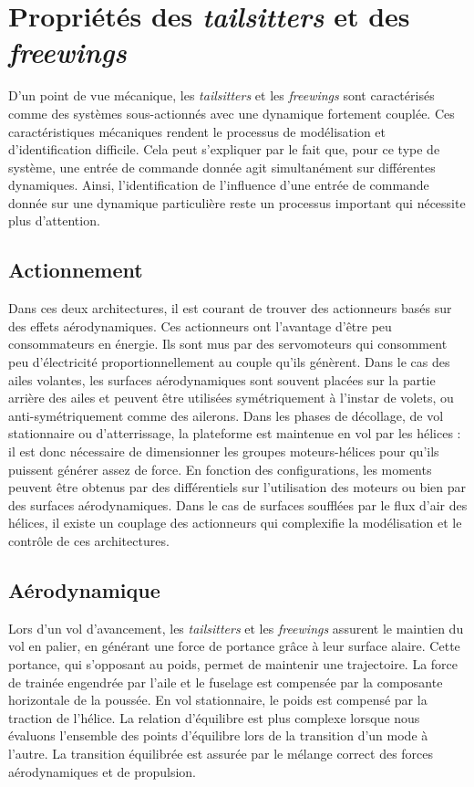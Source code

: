 \section{Propriétés des \textit{tailsitters} et des \textit{freewings}}
    D'un point de vue mécanique, les \textit{tailsitters} et les \textit{freewings} sont caractérisés comme des systèmes sous-actionnés avec une dynamique fortement couplée. Ces caractéristiques mécaniques rendent le processus de modélisation et d'identification difficile. Cela peut s'expliquer par le fait que, pour ce type de système, une entrée de commande donnée agit simultanément sur différentes dynamiques. Ainsi, l'identification de l'influence d'une entrée de commande donnée sur une dynamique particulière reste un processus important qui nécessite plus d'attention.
    \subsection{Actionnement}
    Dans ces deux architectures, il est courant de trouver des actionneurs basés sur des effets aérodynamiques. Ces actionneurs ont l'avantage d'être peu consommateurs en énergie. Ils sont mus par des servomoteurs qui consomment peu d'électricité proportionnellement au couple qu'ils génèrent. Dans le cas des ailes volantes, les surfaces aérodynamiques sont souvent placées sur la partie arrière des ailes et peuvent être utilisées symétriquement à l'instar de volets, ou anti-symétriquement comme des ailerons. 
    Dans les phases de décollage, de vol stationnaire ou d'atterrissage, la plateforme est maintenue en vol par les hélices : il est donc nécessaire de dimensionner les groupes moteurs-hélices pour qu'ils puissent générer assez de force. En fonction des configurations, les moments peuvent être obtenus par des différentiels sur l'utilisation des moteurs ou bien par des surfaces aérodynamiques. Dans le cas de surfaces soufflées par le flux d'air des hélices, il existe un couplage des actionneurs qui complexifie la modélisation et le contrôle de ces architectures.


    \subsection{Aérodynamique}

    Lors d'un vol d'avancement, les \textit{tailsitters} et les \textit{freewings} assurent le maintien du vol en palier, en générant une force de portance grâce à leur surface alaire. Cette portance, qui s'opposant au poids, permet de maintenir une trajectoire. La force de trainée engendrée par l'aile et le fuselage est compensée par la composante horizontale de la poussée. En vol stationnaire, le poids est compensé par la traction de l'hélice. La relation d'équilibre est plus complexe lorsque nous évaluons l'ensemble des points d'équilibre lors de la transition d'un mode à l'autre. La transition équilibrée est assurée par le mélange correct des forces aérodynamiques et de propulsion.

